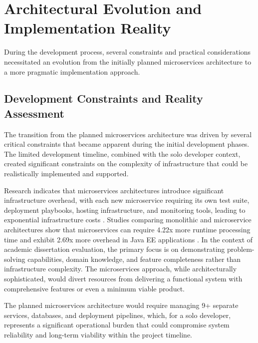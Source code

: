 
\section{Architectural Evolution and Implementation Reality} \label{section:architectural_evolution}

During the development process, several constraints and practical considerations necessitated an evolution from the initially planned microservices architecture to a more pragmatic implementation approach.

\subsection{Development Constraints and Reality Assessment}

The transition from the planned microservices architecture was driven by several critical constraints that became apparent during the initial development phases. The limited development timeline, combined with the solo developer context, created significant constraints on the complexity of infrastructure that could be realistically implemented and supported.

Research indicates that microservices architectures introduce significant infrastructure overhead, with each new microservice requiring its own test suite, deployment playbooks, hosting infrastructure, and monitoring tools, leading to exponential infrastructure costs \cite{ServiceCostOverhead2023}. Studies comparing monolithic and microservice architectures show that microservices can require 4.22x more runtime processing time and exhibit 2.69x more overhead in Java EE applications \cite{MonolithicVsMicroservices2020}. In the context of academic dissertation evaluation, the primary focus is on demonstrating problem-solving capabilities, domain knowledge, and feature completeness rather than infrastructure complexity. The microservices approach, while architecturally sophisticated, would divert resources from delivering a functional system with comprehensive features or even a minimum viable product.

The planned microservices architecture would require managing 9+ separate services, databases, and deployment pipelines, which, for a solo developer, represents a significant operational burden that could compromise system reliability and long-term viability within the project timeline.

